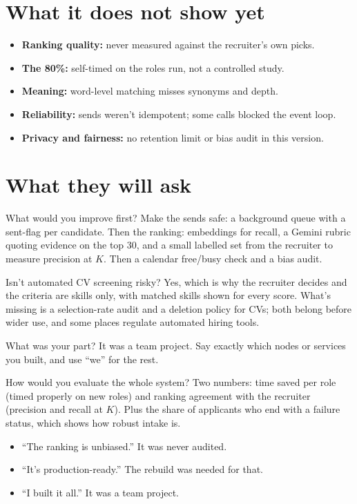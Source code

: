 \section{What it does not show yet}
\begin{itemize}
  \item \textbf{Ranking quality:} never measured against the recruiter's own picks.
  \item \textbf{The 80\%:} self-timed on the roles run, not a controlled study.
  \item \textbf{Meaning:} word-level matching misses synonyms and depth.
  \item \textbf{Reliability:} sends weren't idempotent; some calls blocked the event loop.
  \item \textbf{Privacy and fairness:} no retention limit or bias audit in this version.
\end{itemize}

\section{What they will ask}

\begin{iq}[\core]{What would you improve first?}
Make the sends safe: a background queue with a sent-flag per candidate. Then the ranking: embeddings for recall, a Gemini rubric quoting evidence on the top 30, and a small labelled set from the recruiter to measure precision at $K$. Then a calendar free/busy check and a bias audit.
\end{iq}

\begin{iq}[\core]{Isn't automated CV screening risky?}
Yes, which is why the recruiter decides and the criteria are skills only, with matched skills shown for every score. What's missing is a selection-rate audit and a deletion policy for CVs; both belong before wider use, and some places regulate automated hiring tools.
\end{iq}

\begin{iq}[\core]{What was your part?}
It was a team project. Say exactly which nodes or services you built, and use ``we'' for the rest.
\end{iq}

\begin{iq}{How would you evaluate the whole system?}
Two numbers: time saved per role (timed properly on new roles) and ranking agreement with the recruiter (precision and recall at $K$). Plus the share of applicants who end with a failure status, which shows how robust intake is.
\end{iq}

\begin{bugfix}
\begin{itemize}
  \item ``The ranking is unbiased.'' It was never audited.
  \item ``It's production-ready.'' The rebuild was needed for that.
  \item ``I built it all.'' It was a team project.
\end{itemize}
\end{bugfix}

